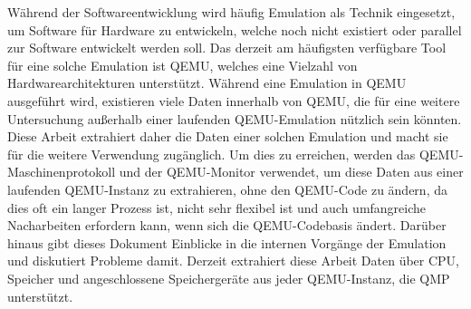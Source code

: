 
\Abstract
Während der Softwareentwicklung wird häufig Emulation als Technik eingesetzt,
um Software für Hardware zu entwickeln, welche noch nicht existiert oder parallel zur Software entwickelt werden soll.
Das derzeit am häufigsten verfügbare Tool für eine solche Emulation ist QEMU, welches eine Vielzahl von Hardwarearchitekturen unterstützt.
Während eine Emulation in QEMU ausgeführt wird,
existieren viele Daten innerhalb von QEMU, die für eine weitere Untersuchung außerhalb einer laufenden QEMU-Emulation nützlich sein könnten.
Diese Arbeit extrahiert daher die Daten einer solchen Emulation und macht sie für die weitere Verwendung zugänglich.
Um dies zu erreichen, werden das QEMU-Maschinenprotokoll und der QEMU-Monitor verwendet, um diese Daten aus einer laufenden QEMU-Instanz zu extrahieren,
ohne den QEMU-Code zu ändern, da dies oft ein langer Prozess ist,
nicht sehr flexibel ist und auch umfangreiche Nacharbeiten erfordern kann, wenn sich die QEMU-Codebasis ändert.
Darüber hinaus gibt dieses Dokument Einblicke in die internen Vorgänge der Emulation und diskutiert Probleme damit.
Derzeit extrahiert diese Arbeit Daten über CPU, Speicher und angeschlossene Speichergeräte aus jeder QEMU-Instanz, die QMP unterstützt.